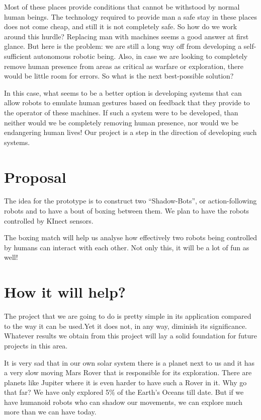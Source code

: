 \documentclass[11pt]{article}
\begin{document}
Most of these places provide conditions that cannot be withstood by normal human beings. The technology required to provide man a safe stay in these places does not come cheap, and still it is not completely safe. So how do we work around this hurdle? Replacing man with machines seems a good answer at first glance. But here is the problem: we are still a long way off from developing a self-sufficient autonomous robotic being. Also, in case we are looking to completely remove human presence from areas as critical as warfare or exploration, there would be little room for errors. So what is the next best-possible solution?


In this case, what seems to be a better option is developing systems that can allow robots to emulate human gestures based on feedback that they provide to the operator of these machines. If such a system were to be developed, than neither would we be completely removing human presence, nor would we be endangering human lives! Our project is a step in the direction of developing such systems.
\section{\textbf{Proposal}}
\label{sec-3}


The idea for the prototype is to construct two “Shadow-Bots”, or action-following robots and to have a bout of boxing between them. We plan to have the robots controlled by KInect sensors. 

The boxing match will help us analyse how effectively two robots being controlled by humans can interact with each other. Not only this, it will be a lot of fun as well!
\section{\textbf{How it will help?}}
\label{sec-4}


The project that we are going to do is pretty simple in its application compared to the way it can be used.Yet it does not, in any way, diminish its significance. Whatever results we obtain from this project will lay a solid foundation for future projects in this area. 

It is very sad that in our own solar system there is a planet next to us and it has a very slow moving Mars Rover that is responsible for its exploration. There are planets like Jupiter where it is even harder to have such a Rover in it. Why go that far? We have only explored 5\% of the Earth’s Oceans till date. But if we have humanoid robots who can shadow our movements, we can explore much more than we can have today. 
\end{document}
